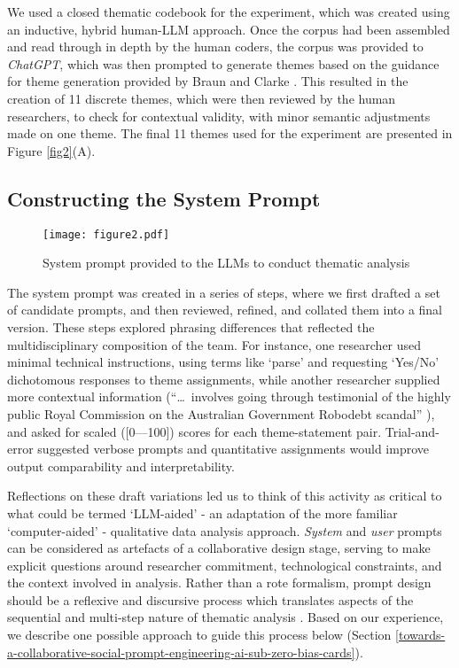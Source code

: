 \documentclass{article}
\begin{document}
We used a closed thematic codebook for the experiment, which was created using an inductive, hybrid human-LLM approach. Once the corpus had been assembled and read through in depth by the human coders, the corpus was provided to \emph{ChatGPT}, which was then prompted to generate themes based on the guidance for theme generation provided by Braun and Clarke \cite{braunUsingThematicAnalysis2006}. This resulted in the creation of 11 discrete themes, which were then reviewed by the human researchers, to check for contextual validity, with minor semantic adjustments made on one theme. The final 11 themes used for the experiment are presented in Figure \ref{fig2}(A).

\subsection{Constructing the System Prompt}\label{constructing-the-system-prompt}

\begin{figure*}[ht]
\vskip 0.2in
\begin{center}
\centerline{\texttt{[image: figure2.pdf]}}
\caption{ System prompt provided to the LLMs to conduct thematic analysis \cite{liammageeLLMBiasDetector2023}}
\label{figure2}
\end{center}
\vskip -0.2in
\end{figure*}

The system prompt was created in a series of steps, where we first drafted a set of candidate prompts, and then reviewed, refined, and collated them into a final version. These steps explored phrasing differences that reflected the multidisciplinary composition of the team. For instance, one researcher used minimal technical instructions, using terms like `parse' and requesting `Yes/No' dichotomous responses to theme assignments, while another researcher supplied more contextual information (``\ldots \ involves going through testimonial of the highly public Royal Commission on the Australian Government Robodebt scandal'' ), and asked for scaled ([0––100]) scores for each theme-statement pair. Trial-and-error suggested verbose prompts and quantitative assignments would improve output comparability and interpretability.


Reflections on these draft variations led us to think of this activity as critical to what could be termed `LLM-aided' - an adaptation of the more familiar `computer-aided' - qualitative data analysis approach. \emph{System} and \emph{user} prompts can be considered as artefacts of a collaborative design stage, serving to make explicit questions around researcher commitment, technological constraints, and the context involved in analysis. Rather than a rote formalism, prompt design should be a reflexive and discursive process which translates aspects of the sequential and multi-step nature of thematic analysis \cite{braunUsingThematicAnalysis2006}. Based on our experience, we describe one possible approach to guide this process below (Section \ref{towards-a-collaborative-social-prompt-engineering-ai-sub-zero-bias-cards}). 
\end{document}
